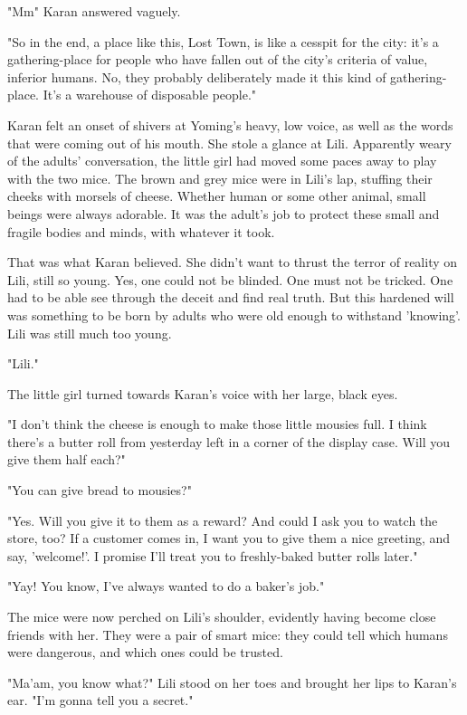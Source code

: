 "Mm\el " Karan answered vaguely.

"So in the end, a place like this, Lost Town, is like a cesspit for the
city: it's a gathering-place for people who have fallen out of the
city's criteria of value, inferior humans. No, they probably
deliberately made it this kind of gathering-place. It's a warehouse of
disposable people."

Karan felt an onset of shivers at Yoming's heavy, low voice, as well as
the words that were coming out of his mouth. She stole a glance at Lili.
Apparently weary of the adults' conversation, the little girl had moved
some paces away to play with the two mice. The brown and grey mice were
in Lili's lap, stuffing their cheeks with morsels of cheese. Whether
human or some other animal, small beings were always adorable. It was
the adult's job to protect these small and fragile bodies and minds,
with whatever it took.

That was what Karan believed. She didn't want to thrust the terror of
reality on Lili, still so young. Yes, one could not be blinded. One must
not be tricked. One had to be able see through the deceit and find real
truth. But this hardened will was something to be born by adults who
were old enough to withstand 'knowing'. Lili was still much too young.

"Lili."

The little girl turned towards Karan's voice with her large, black eyes.

"I don't think the cheese is enough to make those little mousies full. I
think there's a butter roll from yesterday left in a corner of the
display case. Will you give them half each?"

"You can give bread to mousies?"

"Yes. Will you give it to them as a reward? And could I ask you to watch
the store, too? If a customer comes in, I want you to give them a nice
greeting, and say, 'welcome!'. I promise I'll treat you to freshly-baked
butter rolls later."

"Yay! You know, I've always wanted to do a baker's job."

The mice were now perched on Lili's shoulder, evidently having become
close friends with her. They were a pair of smart mice: they could tell
which humans were dangerous, and which ones could be trusted.

"Ma'am, you know what?" Lili stood on her toes and brought her lips to
Karan's ear. "I'm gonna tell you a secret."

